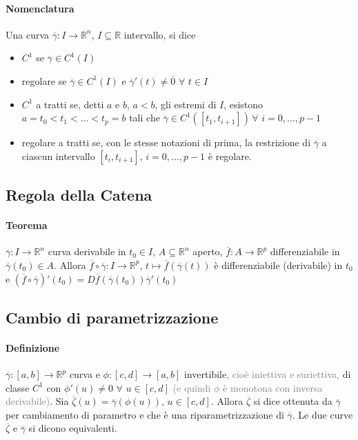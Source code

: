 \documentclass{article}
\newcommand{\R}{\mathbb{R}}
\begin{document}
\paragraph{{Nomenclatura}}
Una curva $\overline{\gamma}: I \rightarrow \R^n$, $I \subseteq \R$ intervallo, si dice
\begin{itemize}
    \item $C^1$ se $\overline{\gamma} \in C^1(I)$
    \item regolare se $\overline{\gamma} \in C^1(I)$ e $\overline{\gamma}'(t)\neq \overline{0} \,\, \forall \,\, t \in I$
    \item $C^1$ a tratti se, detti $a$ e $b$, $a < b$, gli estremi di $I$, esistono $a=t_0 <t_1<...<t_p=b$ tali che $\overline{\gamma} \in C^1([t_1,t_{i+1}]) \,\forall\,\, i =0,..., p-1$
    \item regolare a tratti se, con le stesse notazioni di prima, la restrizione di $\overline{\gamma}$ a ciascun intervallo  $[t_i,t_{i+1}]$, $i=0,...,p-1$ è regolare.
\end{itemize}

\subsection{{Regola della Catena}}
\paragraph{{Teorema}}
$\overline{\gamma}: I \rightarrow \R^n$ curva derivabile in $t_0 \in I$, $A \subseteq \R^n$ aperto, $\overline{f}: A \rightarrow \R^p$ differenziabile in $\overline{\gamma}(t_0)\in A$. Allora 
$\overline{f}\circ \overline{\gamma}: I \rightarrow \R^p$, $t \mapsto \overline{f}(\overline{\gamma}(t))$ è differenziabile (derivabile) in $t_0$ e $(\overline{f}\circ \overline{\gamma})'(t_0)=D\overline{f}(\overline{\gamma}(t_0))\overline{\gamma}'(t_0)$

\subsection{{Cambio di parametrizzazione}}
\paragraph{{Definizione}}
$\overline{\gamma}:[a,b]\rightarrow \R^p$ curva e $\phi: [c,d]\rightarrow [a,b]$ invertibile\textcolor{grey}{, cioè iniettiva e suriettiva,} di classe $C^1$ con $\phi'(u)\neq 0 \,\, \forall \,\, u \in [c,d]$ \textcolor{grey}{(e quindi $\phi$ è monotona con inversa derivabile)}. Sia $\overline{\zeta}(u)=\overline{\gamma}(\phi(u))$, $u \in [c,d]$. Allora $\overline{\zeta}$ si dice ottenuta da $\overline{\gamma}$ per cambiamento di parametro e che è una riparametrizzazione di $\overline{\gamma}$. Le due curve $\overline{\zeta}$ e $\overline{\gamma}$ si dicono equivalenti.
\end{document}

